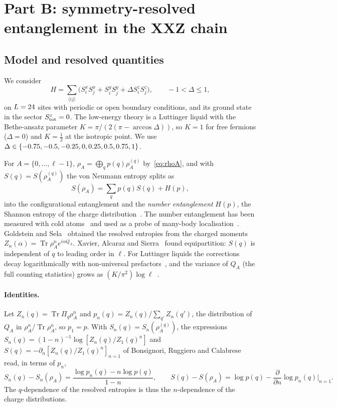 \documentclass[11pt]{article}
\DeclareMathOperator{\Tr}{Tr}
\begin{document}
\section{Part B: symmetry-resolved entanglement in the XXZ chain}\label{sec:sre}

\subsection{Model and resolved quantities}\label{sec:sre-model}

We consider
\begin{equation}\label{eq:xxz}
  H=\sum_{\langle ij\rangle}\bigl(S^x_iS^x_j+S^y_iS^y_j+\Delta S^z_iS^z_j\bigr),\qquad -1<\Delta\le1,
\end{equation}
on $L=24$ sites with periodic or open boundary conditions, and its ground state in the sector $S^z_{\rm tot}=0$. The
low-energy theory is a Luttinger liquid with the Bethe-ansatz parameter $K=\pi/(2(\pi-\arccos\Delta))$, so $K=1$ for
free fermions ($\Delta=0$) and $K=\frac12$ at the isotropic point. We use $\Delta\in\{-0.75, -0.5, -0.25, 0, 0.25, 0.5, 0.75, 1\}$.

For $A=\{0,\dots,\ell-1\}$, $\rho_A=\bigoplus_qp(q)\rho_A^{(q)}$ by~\eqref{eq:rhoA}, and with $S(q)=S(\rho_A^{(q)})$ the
von Neumann entropy splits as
\begin{equation}\label{eq:split}
  S(\rho_A)=\sum_qp(q)S(q)+H(p),
\end{equation}
into the configurational entanglement and the \emph{number entanglement} $H(p)$, the Shannon entropy of the charge
distribution~\cite{laflorencie2014,goldstein2018,xavier2018}. The number entanglement has been measured with cold
atoms~\cite{lukin2019} and used as a probe of many-body localisation~\cite{kiefer2020}. Goldstein and
Sela~\cite{goldstein2018} obtained the resolved entropies from the charged moments $Z_n(\alpha)=\Tr\rho_A^ne^{i\alpha
Q_A}$. Xavier, Alcaraz and Sierra~\cite{xavier2018} found equipartition: $S(q)$ is independent of $q$ to leading order
in $\ell$. For Luttinger liquids the corrections decay logarithmically with non-universal
prefactors~\cite{estienne2021}, and the variance of $Q_A$ (the full counting statistics) grows as
$(K/\pi^2)\log\ell$~\cite{song2012}.

\paragraph{Identities.} Let $Z_n(q)=\Tr\Pi_q\rho_A^n$ and $p_n(q)=Z_n(q)/\sum_{q'}Z_n(q')$, the distribution of $Q_A$ in
$\rho_A^n/\Tr\rho_A^n$, so $p_1=p$. With $S_n(q)=S_n(\rho_A^{(q)})$, the expressions $S_n(q)=(1-n)^{-1}\log[Z_n(q)/Z_1(q)^n]$
and $S(q)=-\partial_n[Z_n(q)/Z_1(q)^n]_{n=1}$ of Bonsignori, Ruggiero and Calabrese~\cite[Eq.~(2.6)]{bonsignori2019}
read, in terms of $p_n$,
\begin{equation}\label{eq:id}
  S_n(q)-S_n(\rho_A)=\frac{\log p_n(q)-n\log p(q)}{1-n},\qquad
  S(q)-S(\rho_A)=\log p(q)-\frac{\partial}{\partial n}\log p_n(q)\Big|_{n=1}.
\end{equation}
The $q$-dependence of the resolved entropies is thus the $n$-dependence of the charge distributions.
\end{document}
